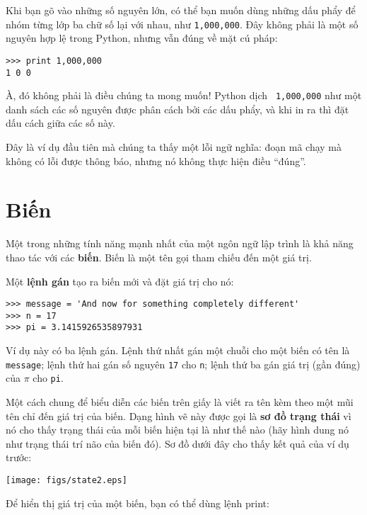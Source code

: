 \documentclass[11pt]{book}
\begin{document}
Khi bạn gõ vào những số nguyên lớn, có thể bạn muốn dùng những dấu
phẩy để nhóm từng lớp ba chữ số lại với nhau, như {\tt 1,000,000}. 
Đây không phải là một số nguyên hợp lệ trong Python, nhưng vẫn đúng
về mặt cú pháp:

\beforeverb
\begin{verbatim}
>>> print 1,000,000
1 0 0
\end{verbatim}
\afterverb
%
À, đó không phải là điều chúng ta mong muốn! Python dịch {\tt
  1,000,000} như một danh sách các số nguyên được phân cách bởi các
dấu phẩy, và khi in ra thì đặt dấu cách giữa các số này.


Đây là ví dụ đầu tiên mà chúng ta thấy một lỗi ngữ nghĩa: đoạn mã
chạy mà không có lỗi được thông báo, nhưng nó không thực hiện điều
``đúng''.


\section{Biến}

Một trong những tính năng mạnh nhất của một ngôn ngữ lập trình là
khả năng thao tác với các {\bf biến}. Biến là một tên gọi tham chiếu
đến một giá trị.

Một {\bf lệnh gán} tạo ra biến mới và đặt giá trị cho nó:

\beforeverb
\begin{verbatim}
>>> message = 'And now for something completely different'
>>> n = 17
>>> pi = 3.1415926535897931
\end{verbatim}
\afterverb
%
Ví dụ này có ba lệnh gán. Lệnh thứ nhất gán một chuỗi cho một
biến có tên là {\tt message}; lệnh thứ hai gán số nguyên {\tt 17}
cho {\tt n}; lệnh thứ ba gán giá trị (gần đúng) của $\pi$ cho {\tt pi}.


Một cách chung để biểu diễn các biến trên giấy là viết ra tên kèm theo
một mũi tên chỉ đến giá trị của biến. Dạng hình vẽ này được gọi là 
{\bf sơ đồ trạng thái} vì nó cho thấy trạng thái của mỗi biến hiện tại
là như thế nào (hãy hình dung nó như trạng thái trí não của biến đó).
Sơ đồ dưới đây cho thấy kết quả của ví dụ trước:

\beforefig
\centerline{\texttt{[image: figs/state2.eps]}}
\afterfig

Để hiển thị giá trị của một biến, bạn có thể dùng lệnh print:
\end{document}
